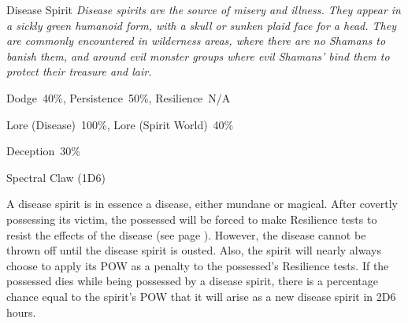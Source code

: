 \begin{monsterbox}{Disease Spirit}
	\textit{Disease spirits are the source of misery and illness. They appear in a sickly green humanoid form, with a skull or sunken plaid face for a head.
They are commonly encountered in wilderness areas, where there are no Shamans to banish them, and around evil monster groups where evil Shamans’ bind them to protect their treasure and lair.}\\
	\rpghline
	\basics[%
	powerpoints = 17,
	movementrate = 30m,
	plunderrating = 0
	]
	\rpghline%
	\stats[ %
		STR = -,
		CON = -,
		DEX = -,
		SIZ = -,
		INT = 2D6    (7),
		POW = 3D6+6  (17),
		CHA = 3D6    (11)
	]
	\rpghline%
	\begin{rpg-monsteraction}[Resistances]
		Dodge~40\%, Persistence~50\%, Resilience~N/A
	\end{rpg-monsteraction}
	\begin{rpg-monsteraction}[Knowledge]
		Lore (Disease)~100\%, Lore (Spirit World)~40\%
	\end{rpg-monsteraction}
	\begin{rpg-monsteraction}[Practical]
		Deception~30\%
	\end{rpg-monsteraction}
	\begin{rpg-monsteraction}
		Spectral Claw (1D6)
	\end{rpg-monsteraction}
	\begin{rpg-monsteraction}
		A disease spirit is in essence a disease, either mundane or magical. After covertly possessing its victim, the possessed will be forced to make Resilience tests to resist the effects of the disease (see page \pageref{ssec:disease}). However, the disease cannot be thrown off until the disease spirit is ousted. Also, the spirit will nearly always choose to apply its POW as a penalty to the possessed’s Resilience tests.
		If the possessed dies while being possessed by a disease spirit, there is a percentage chance equal to the spirit’s POW that it will arise as a new disease spirit in 2D6 hours.
	\end{rpg-monsteraction}
\end{monsterbox}


